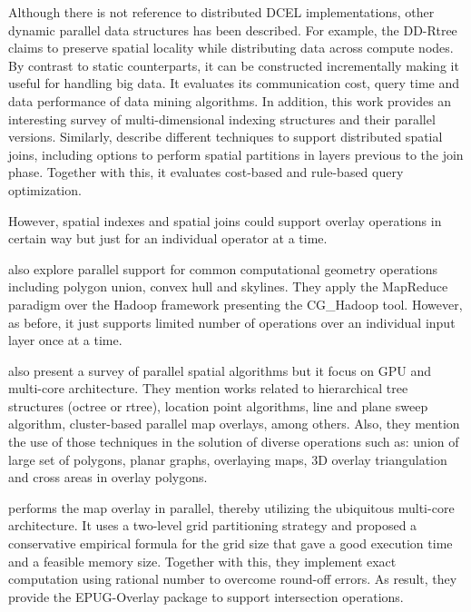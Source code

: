 Although there is not reference to distributed DCEL implementations, other dynamic parallel data structures has been described.  For example, the DD-Rtree \cite{challa_dd-rtree_2016} claims to preserve spatial locality while distributing data across compute nodes.  By contrast to static counterparts, it can be constructed incrementally making it useful for handling big data.  It evaluates its communication cost, query time and data performance of data mining algorithms.  In addition, this work provides an interesting survey of multi-dimensional indexing structures and their parallel versions.  Similarly, \cite{sabek_spatial_2017} describe different techniques to support distributed spatial joins, including options to perform spatial partitions in layers previous to the join phase.  Together with this, it evaluates cost-based and rule-based query optimization.  

However, spatial indexes and spatial joins could support overlay operations in certain way but just for an individual operator at a time. 

\cite{li_scalable_2019} also explore parallel support for common computational geometry operations including polygon union, convex hull and skylines.  They apply the MapReduce paradigm over the Hadoop framework presenting the CG\_Hadoop tool.  However, as before, it just supports limited number of operations over an individual input layer once at a time.

\cite{franklin_data_2018} also present a survey of parallel spatial algorithms but it focus on GPU and multi-core architecture.  They mention works related to hierarchical tree structures (octree or rtree), location point algorithms, line and plane sweep algorithm, cluster-based parallel map overlays, among others.  Also, they mention the use of those techniques in the solution of diverse operations such as: union of large set of polygons, planar graphs, overlaying maps, 3D overlay triangulation and cross areas in overlay polygons.

\cite{magalhaes_fast_2015} performs the map overlay in parallel, thereby utilizing the ubiquitous multi-core architecture.  It uses a two-level grid partitioning strategy and proposed a conservative empirical formula for the grid size that gave a good execution time and a feasible memory size.  Together with this, they implement exact computation using rational number to overcome round-off errors. As result, they provide the EPUG-Overlay package to support intersection operations.

